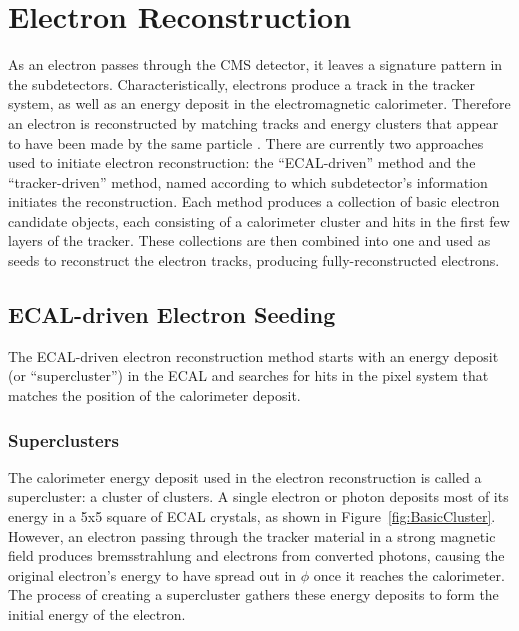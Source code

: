 \section{Electron Reconstruction}
\label{evReco:elec}
As an electron 
passes through the CMS detector, 
it leaves a signature pattern in the subdetectors.  
Characteristically, electrons produce a track 
in the tracker system, 
as well as an energy deposit in the 
electromagnetic calorimeter.  
Therefore an electron is reconstructed 
by matching tracks and energy clusters 
that appear to have been made by the same particle 
\cite{CMS-NOTE-2006-040}.  
There are currently two approaches used to 
initiate electron reconstruction: 
the ``ECAL-driven'' method and 
the ``tracker-driven'' method, 
named according to which subdetector's 
information initiates the reconstruction.  
Each method produces a collection of 
basic electron candidate objects, 
each consisting of a calorimeter cluster 
and hits in the first few layers of the tracker.  
These collections are then combined into one 
and used as seeds to reconstruct the electron tracks, 
producing fully-reconstructed electrons.  

\subsection{ECAL-driven Electron Seeding}
\label{evReco:ecalDrv}

The ECAL-driven electron reconstruction method 
starts with an energy deposit (or ``supercluster'') 
in the ECAL 
and searches for hits in the 
pixel system that matches the 
position of the calorimeter deposit.  

\subsubsection{Superclusters}
\label{evReco:SC}

The calorimeter energy deposit used in the electron 
reconstruction is called a supercluster: 
a cluster of clusters.  
A single electron or photon deposits most of its energy 
in a 5x5 square of ECAL crystals, 
as shown in Figure~\ref{fig:BasicCluster}.  
However, an electron passing through the tracker material 
in a strong magnetic field produces 
bremsstrahlung and electrons from converted photons, 
causing the original electron's energy to 
have spread out in $\phi$ once it reaches the calorimeter.  
The process of creating a supercluster gathers these 
energy deposits to form the initial energy of the electron.  

